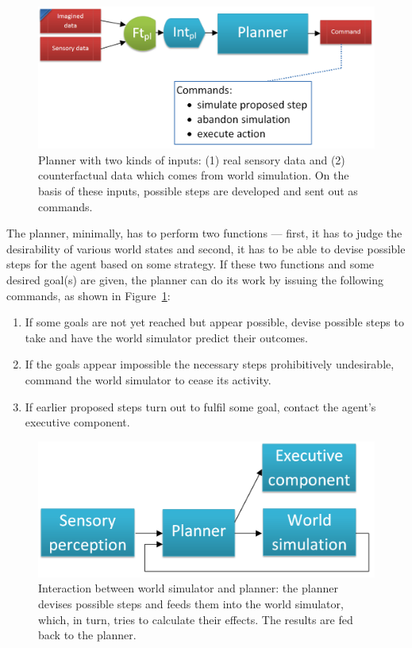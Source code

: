 \begin{figure}
	\centering
	\includegraphics[width=\textwidth]{figs/planner.png}
	\caption{Planner with two kinds of inputs: (1) real sensory data and (2) counterfactual data which comes from world simulation. On the basis of these inputs, possible steps are developed and sent out as commands.}
	\label{fig:planner}
\end{figure}

The planner, minimally, has to perform two functions --- first, it has to judge the desirability of various world states and second, it has to be able to devise possible steps for the agent based on some strategy. If these two functions and some desired goal(s) are given, the planner can do its work by issuing the following commands, as shown in Figure~\ref{fig:planner}:
\begin{enumerate}
	\item If some goals are not yet reached but appear possible, devise possible steps to take and have the world simulator predict their outcomes.
	\item If the goals appear impossible the necessary steps prohibitively undesirable, command the world simulator to cease its activity.
	\item If earlier proposed steps turn out to fulfil some goal, contact the agent's executive component.
\end{enumerate}

\begin{figure}
	\centering
	\includegraphics[width=\textwidth]{figs/worldSimulatorPlannerInteraction.png}
	\caption{Interaction between world simulator and planner: the planner devises possible steps and feeds them into the world simulator, which, in turn, tries to calculate their effects. The results are fed back to the planner.}
	\label{fig:worldSimulatorPlannerInteraction}
\end{figure}

